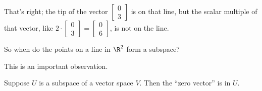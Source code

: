 \documentclass{ximera}
\begin{document}
\begin{question}
\begin{solution}
\begin{hint}
\begin{question}
        That's right; the tip of the vector $\begin{bmatrix} 0 \\
          3 \end{bmatrix}$ is on that line, but the scalar multiple of
        that vector, like $2 \cdot \begin{bmatrix} 0 \\
          3 \end{bmatrix} = \begin{bmatrix} 0 \\ 6 \end{bmatrix}$, is
        not on the line.
      \end{question}
    \end{hint}

    So when do the points on a line in $\R^2$ form a subspace?
    \begin{multiple-choice}
    \end{multiple-choice}

    This is an important observation.

    \begin{observation}
      Suppose $U$ is a subspace of a vector space $V$.  Then the ``zero vector'' is in $U$.
    \end{observation}
  \end{solution}
\end{question}
\end{document}
